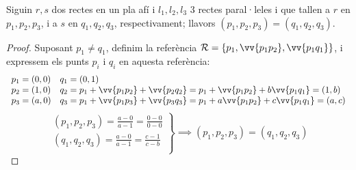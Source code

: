\begin{thm}[de Tales]
	Siguin $r,s$ dos rectes en un pla afí i $l_1,l_2,l_3$ 3 rectes paral·leles i que tallen a $r$ en $p_1,p_2,p_3$, i a $s$ en $q_1,q_2,q_3$, respectivament; llavors $(p_1,p_2,p_3)=(q_1,q_2,q_3)$.
\end{thm}
\begin{proof}
	Suposant $p_1\neq q_1$, definim la referència $\mathcal{R}=\{p_1,\vv{p_1p_2},\vv{p_1q_1}\}$, i expressem els punts $p_i$ i $q_i$ en aquesta referència: \\
	\[\begin{array}{ll}
		p_1=(0,0) & q_1=(0,1)\\
		p_2=(1,0) & q_2=p_1+\vv{p_1p_2}+\vv{p_2q_2}=p_1+\vv{p_1p_2}+b\vv{p_1q_1}=(1,b) \\
		p_3=(a,0) & q_3=p_1+\vv{p_1p_3}+\vv{p_3q_3}=p_1+a\vv{p_1p_2}+c\vv{p_1q_1}=(a,c)\\
	\end{array}\]
	\[\left.\begin{array}{l}
		(p_1,p_2,p_3)=\frac{a-0}{a-1}=\frac{0-0}{0-0} \\
		(q_1,q_2,q_3)=\frac{a-0}{a-1}=\frac{c-1}{c-b} \\
	\end{array}\right\}\implies (p_1,p_2,p_3)=(q_1,q_2,q_3)\]
\end{proof}

